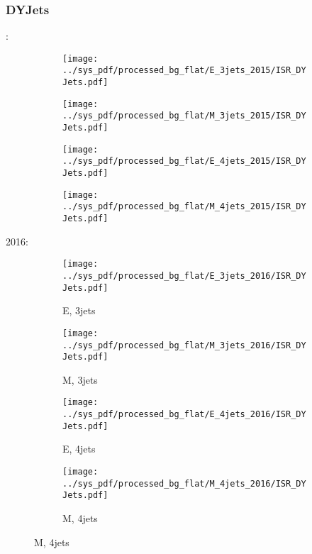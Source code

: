 \documentclass{beamer}
\begin{document}
\begin{frame}
\frametitle{DYJets}
\fontsize{5}{1}:
\begin{figure}
\centering
\begin{subfigure}[b]{0.24\textwidth}
\texttt{[image: ../sys\_pdf/processed\_bg\_flat/E\_3jets\_2015/ISR\_DYJets.pdf]}
\end{subfigure}
\begin{subfigure}[b]{0.24\textwidth}
\texttt{[image: ../sys\_pdf/processed\_bg\_flat/M\_3jets\_2015/ISR\_DYJets.pdf]}
\end{subfigure}
\begin{subfigure}[b]{0.24\textwidth}
\texttt{[image: ../sys\_pdf/processed\_bg\_flat/E\_4jets\_2015/ISR\_DYJets.pdf]}
\end{subfigure}
\begin{subfigure}[b]{0.24\textwidth}
\texttt{[image: ../sys\_pdf/processed\_bg\_flat/M\_4jets\_2015/ISR\_DYJets.pdf]}
\end{subfigure}
\end{figure}
2016:
\begin{figure}
\centering
\begin{subfigure}[b]{0.24\textwidth}
\texttt{[image: ../sys\_pdf/processed\_bg\_flat/E\_3jets\_2016/ISR\_DYJets.pdf]}
\captionsetup{font=tiny}
\caption{E, 3jets}
\end{subfigure}
\begin{subfigure}[b]{0.24\textwidth}
\texttt{[image: ../sys\_pdf/processed\_bg\_flat/M\_3jets\_2016/ISR\_DYJets.pdf]}
\captionsetup{font=tiny}
\caption{M, 3jets}
\end{subfigure}
\begin{subfigure}[b]{0.24\textwidth}
\texttt{[image: ../sys\_pdf/processed\_bg\_flat/E\_4jets\_2016/ISR\_DYJets.pdf]}
\captionsetup{font=tiny}
\caption{E, 4jets}
\end{subfigure}
\begin{subfigure}[b]{0.24\textwidth}
\texttt{[image: ../sys\_pdf/processed\_bg\_flat/M\_4jets\_2016/ISR\_DYJets.pdf]}
\captionsetup{font=tiny}
\caption{M, 4jets}
\end{subfigure}
\end{figure}
\end{frame}
\end{document}
